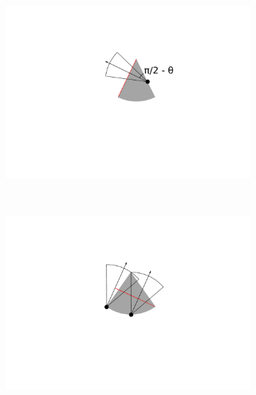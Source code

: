 \begin{figure}[t]
       \centering
        \begin{subfigure}[t]{0.4\textwidth}
                \centering
        \includegraphics[width=1\textwidth, trim=8cm 9cm 8cm 4cm]{imgs/x4is0.pdf}
                \caption{}
                \label{f:SW4--9nox4}
        \end{subfigure}
~ 
        \begin{subfigure}[t]{0.4\textwidth}
                \centering
        \includegraphics[width=1\textwidth, trim=8cm 9cm 8cm 4cm]{imgs/4--9int3.pdf}
                \caption{}
                \label{f:4--9int3}
        \end{subfigure}


\end{figure}
